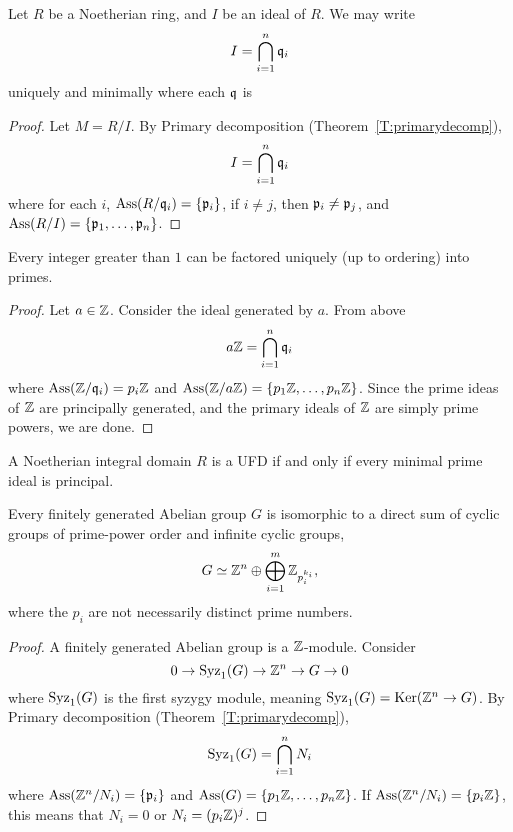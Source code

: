 \documentclass{ximera}
\begin{document}
\begin{theorem}\label{T:PDI}
  Let $R$ be a Noetherian ring, and $I$ be an ideal of $R$. We may write
  \[
  I = \bigcap_{i=1}^n \mathfrak{q}_i
  \]
  uniquely and minimally where each $\mathfrak{q}$ is 
  \begin{proof}
    Let $M = R/I$. By Primary decomposition (Theorem~\ref{T:primarydecomp}),
    \[
    I = \bigcap_{i=1}^n \mathfrak{q}_i
    \]
    where for each $i$, $\operatorname{Ass}(R/\mathfrak{q}_i) = \{\mathfrak{p}_i\}$, if $i\ne j$, then
    $\mathfrak{p}_i\ne\mathfrak{p}_j$, and $\operatorname{Ass}(R/I) = \{\mathfrak{p}_1,\dots,\mathfrak{p}_n\}$.
  \end{proof}
\end{theorem}

\begin{theorem}
  Every integer greater than $1$ can be factored uniquely (up to
  ordering) into primes.
  \begin{proof}
    Let $a\in\mathbb Z$. Consider the ideal generated by $a$. From above
    \[
    a\mathbb Z = \bigcap_{i=1}^n \mathfrak{q}_i
    \]
    where $\operatorname{Ass}(\mathbb Z/\mathfrak{q}_i) = p_i\mathbb Z$ and $\operatorname{Ass}(\mathbb Z/a\mathbb Z) = \{p_1\mathbb Z,\dots,
    p_n\mathbb Z\}$. Since the prime ideas of $\mathbb Z$ are principally generated,
    and the primary ideals of $\mathbb Z$ are simply prime powers, we are
    done.
  \end{proof}
\end{theorem}

\begin{exercise}%
   A Noetherian integral domain $R$ is a UFD if and only if every minimal
   prime ideal is principal.
\end{exercise}

\begin{theorem}
  Every finitely generated Abelian group $G$ is isomorphic to a
  direct sum of cyclic groups of prime-power order and infinite cyclic
  groups,
  \[
  G \simeq \mathbb Z^n \oplus \bigoplus_{i=1}^{m} \mathbb Z_{p_i^{k_i}},
  \]
  where the $p_i$ are not necessarily distinct prime numbers.
  \begin{proof}
    A finitely generated Abelian group is a $\mathbb Z$-module. Consider
    \[
    0 \to \operatorname{Syz}_1(G) \to \mathbb Z^n \to G \to 0 
    \]
    where $\operatorname{Syz}_1(G)$ is the first syzygy module, meaning $\operatorname{Syz}_1(G) =
    \mathop{\mathrm{Ker}}\nolimits(\mathbb Z^n \to G)$. By Primary decomposition (Theorem~\ref{T:primarydecomp}),
    \[
    \operatorname{Syz}_1(G) = \bigcap_{i=1}^n N_i
    \]
    where $\operatorname{Ass}(\mathbb Z^n/N_i) = \{\mathfrak{p}_i\}$ and $\operatorname{Ass}(G) =
    \{p_1\mathbb Z,\dots,p_n\mathbb Z\}$. If $\operatorname{Ass}(\mathbb Z^n/N_i) = \{p_i\mathbb Z\}$, this
    means that $N_i = 0$ or $N_i = (p_i\mathbb Z)^j$.
  \end{proof}
\end{theorem}
\end{document}
